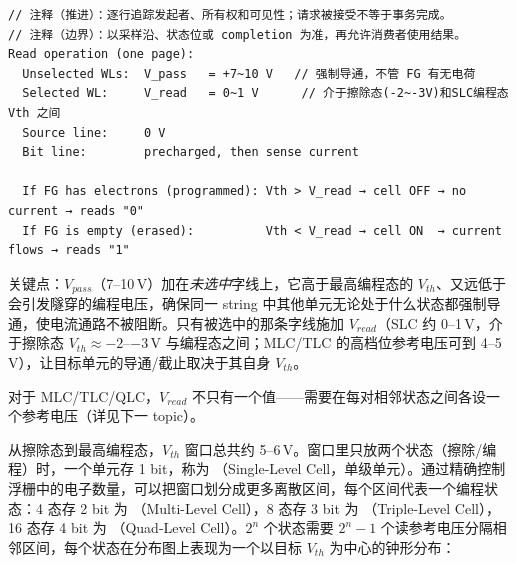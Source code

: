 \begin{lstlisting}
// 注释（推进）：逐行追踪发起者、所有权和可见性；请求被接受不等于事务完成。
// 注释（边界）：以采样沿、状态位或 completion 为准，再允许消费者使用结果。
Read operation (one page):
  Unselected WLs:  V_pass   = +7~10 V   // 强制导通，不管 FG 有无电荷
  Selected WL:     V_read   = 0~1 V      // 介于擦除态(-2~-3V)和SLC编程态 Vth 之间
  Source line:     0 V
  Bit line:        precharged, then sense current

  If FG has electrons (programmed): Vth > V_read → cell OFF → no current → reads "0"
  If FG is empty (erased):          Vth < V_read → cell ON  → current flows → reads "1"
\end{lstlisting}

关键点：$V_{pass}$（7--10\,V）加在\emph{未选中}字线上，它高于最高编程态的 $V_{th}$、又远低于会引发隧穿的编程电压，确保同一 string 中其他单元无论处于什么状态都强制导通，使电流通路不被阻断。只有被选中的那条字线施加 $V_{read}$（SLC 约 0--1\,V，介于擦除态 $V_{th}\approx-2$--$-3$\,V 与编程态之间；MLC/TLC 的高档位参考电压可到 4--5\,V），让目标单元的导通/截止取决于其自身 $V_{th}$。

对于 MLC/TLC/QLC，$V_{read}$ 不只有一个值——需要在每对相邻状态之间各设一个参考电压（详见下一 topic）。


从擦除态到最高编程态，$V_{th}$ 窗口总共约 5--6\,V。窗口里只放两个状态（擦除/编程）时，一个单元存 1 bit，称为 （Single-Level Cell，单级单元）。通过精确控制浮栅中的电子数量，可以把窗口划分成更多离散区间，每个区间代表一个编程状态：4 态存 2 bit 为 （Multi-Level Cell），8 态存 3 bit 为 （Triple-Level Cell），16 态存 4 bit 为 （Quad-Level Cell）。$2^n$ 个状态需要 $2^n - 1$ 个读参考电压分隔相邻区间，每个状态在分布图上表现为一个以目标 $V_{th}$ 为中心的钟形分布：

